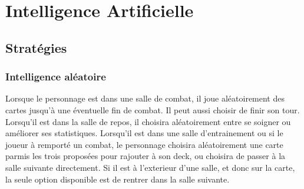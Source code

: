 \section{Intelligence Artificielle}

\subsection{Stratégies}
    \subsubsection{Intelligence aléatoire}
        Lorsque le personnage est dans une salle de combat, il joue aléatoirement des cartes jusqu'à une éventuelle fin de combat. Il peut aussi choisir de finir son tour. Lorsqu'il est dans la salle de repos, il choisira aléatoirement entre se soigner ou améliorer ses statistiques. Lorsqu'il est dans une salle d'entrainement ou si le joueur à remporté un combat, le personnage choisira aléatoirement une carte parmis les trois proposées pour rajouter à son deck, ou choisira de passer à la salle suivante directement. Si il est à l'exterieur d'une salle, et donc sur la carte, la seule option disponible est de rentrer dans la salle suivante.
    
